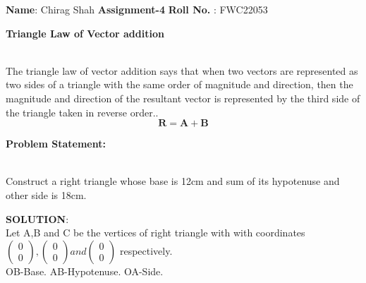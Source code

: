 \documentclass[10pt,a4paper]{report}
\begin{document}
\raggedright \textbf{Name}:\hspace{1mm} Chirag Shah\hspace{3cm} \Large \textbf{Assignment-4}\hspace{2.5cm} %
\normalsize \textbf{Roll No.} :\hspace{1mm} FWC22053\vspace{1cm}
\begin{multicols}{2}

\textbf{Triangle Law of Vector addition }
\vspace{0.5cm}\raggedright \\
The triangle law of vector addition says that when two vectors are represented as two sides of a triangle with the same order of magnitude and direction, then the magnitude and direction of the resultant vector is represented by the third side of the triangle taken in reverse order..\vspace{3mm} \\ 
\begin{equation}
\boldsymbol{R}=\boldsymbol{A}+\boldsymbol{B} 
\end{equation}
\raggedright \textbf{Problem Statement:}\vspace{2mm}
\raggedright \\Construct a right triangle whose base is 12cm and sum of its hypotenuse and other side is 18cm.\\
\vspace{5mm}
\raggedright \textbf{SOLUTION}:\vspace{2mm}\\
Let A,B and C be the vertices of right triangle with with coordinates $\begin{pmatrix}
0 \\
0 
\end{pmatrix} 
, \begin{pmatrix}
0 \\
0 
\end{pmatrix} 
 and \begin{pmatrix}
0 \\
0 
\end{pmatrix} $
\vspace{1mm} respectively.\vspace{2mm}\\
OB-Base.
AB-Hypotenuse.
OA-Side.\\\vspace{2mm}

\end{multicols}
\end{document}
